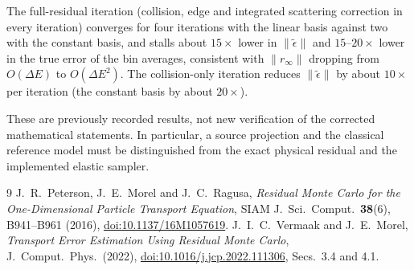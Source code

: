 \documentclass[11pt]{article}
\newcommand{\teps}{\tilde\epsilon}
\begin{document}
\noindent The full-residual iteration (collision, edge and integrated scattering
correction in every iteration) converges for four iterations with the linear basis
against two with the constant basis, and stalls about $15\times$ lower in
$\|\teps\|$ and $15$--$20\times$ lower in the true error of the bin averages, consistent
with $\|r_\infty\|$ dropping from $O(\Delta E)$ to $O(\Delta E^2)$. The collision-only
iteration reduces $\|\teps\|$ by about $10\times$ per iteration (the constant basis by
about $20\times$).

\noindent These are previously recorded results, not new verification of the
corrected mathematical statements. In particular, a source projection and the
classical reference model must be distinguished from the exact physical residual
and the implemented elastic sampler.

\begin{thebibliography}{9}
 J.~R.~Peterson, J.~E.~Morel and J.~C.~Ragusa,
  \emph{Residual Monte Carlo for the One-Dimensional Particle Transport Equation},
  SIAM J.\ Sci.\ Comput.\ \textbf{38}(6), B941--B961 (2016),
  \href{https://doi.org/10.1137/16M1057619}{doi:10.1137/16M1057619}.
 J.~I.~C.~Vermaak and J.~E.~Morel,
  \emph{Transport Error Estimation Using Residual Monte Carlo},
  J.\ Comput.\ Phys.\ (2022),
  \href{https://doi.org/10.1016/j.jcp.2022.111306}{doi:10.1016/j.jcp.2022.111306},
  Secs.~3.4 and 4.1.
\end{thebibliography}
\end{document}
